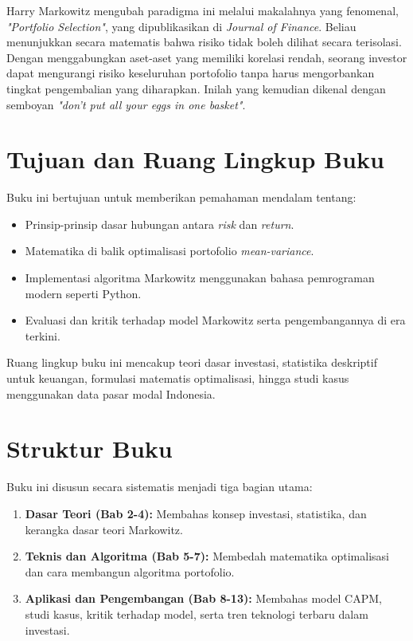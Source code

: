 \documentclass[12pt,a4paper]{book}
\begin{document}
Harry Markowitz mengubah paradigma ini melalui makalahnya yang fenomenal, \textit{"Portfolio Selection"}, yang dipublikasikan di \textit{Journal of Finance}. Beliau menunjukkan secara matematis bahwa risiko tidak boleh dilihat secara terisolasi. Dengan menggabungkan aset-aset yang memiliki korelasi rendah, seorang investor dapat mengurangi risiko keseluruhan portofolio tanpa harus mengorbankan tingkat pengembalian yang diharapkan. Inilah yang kemudian dikenal dengan semboyan \textit{"don't put all your eggs in one basket"}.

\section{Tujuan dan Ruang Lingkup Buku}
Buku ini bertujuan untuk memberikan pemahaman mendalam tentang:
\begin{itemize}
    \item Prinsip-prinsip dasar hubungan antara \textit{risk} dan \textit{return}.
    \item Matematika di balik optimalisasi portofolio \textit{mean-variance}.
    \item Implementasi algoritma Markowitz menggunakan bahasa pemrograman modern seperti Python.
    \item Evaluasi dan kritik terhadap model Markowitz serta pengembangannya di era terkini.
\end{itemize}

Ruang lingkup buku ini mencakup teori dasar investasi, statistika deskriptif untuk keuangan, formulasi matematis optimalisasi, hingga studi kasus menggunakan data pasar modal Indonesia.

\section{Struktur Buku}
Buku ini disusun secara sistematis menjadi tiga bagian utama:
\begin{enumerate}
    \item \textbf{Dasar Teori (Bab 2-4):} Membahas konsep investasi, statistika, dan kerangka dasar teori Markowitz.
    \item \textbf{Teknis dan Algoritma (Bab 5-7):} Membedah matematika optimalisasi dan cara membangun algoritma portofolio.
    \item \textbf{Aplikasi dan Pengembangan (Bab 8-13):} Membahas model CAPM, studi kasus, kritik terhadap model, serta tren teknologi terbaru dalam investasi.
\end{enumerate}
\end{document}

